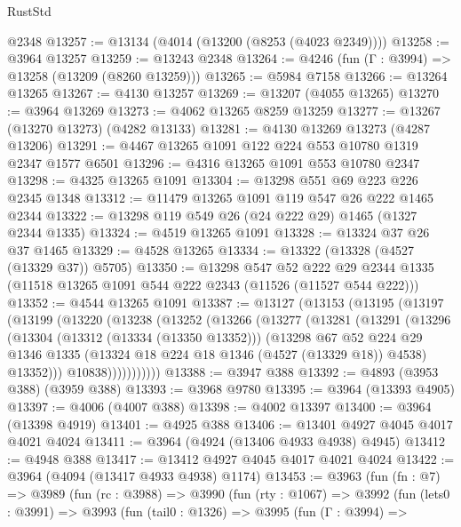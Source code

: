 \begin{lexlean}{RustStd}
\begin{coremodule}
    @2348
@13257 := @13134 (@4014 (@13200 (@8253 (@4023 @2349))))
@13258 := @3964 @13257
@13259 := @13243 @2348
@13264 := @4246 (fun (Γ : @3994) => @13258 (@13209 (@8260 @13259)))
@13265 := @5984 @7158
@13266 := @13264 @13265
@13267 := @4130 @13257
@13269 := @13207 (@4055 @13265)
@13270 := @3964 @13269
@13273 := @4062 @13265 @8259 @13259
@13277 := @13267 (@13270 @13273) (@4282 @13133)
@13281 := @4130 @13269 @13273 (@4287 @13206)
@13291 := @4467 @13265 @1091 @122 @224 @553 @10780 @1319 @2347 @1577 @6501
@13296 := @4316 @13265 @1091 @553 @10780 @2347
@13298 := @4325 @13265 @1091
@13304 := @13298 @551 @69 @223 @226 @2345 @1348
@13312 := @11479 @13265 @1091 @119 @547 @26 @222 @1465 @2344
@13322 := @13298 @119 @549 @26 (@24 @222 @29) @1465 (@1327 @2344 @1335)
@13324 := @4519 @13265 @1091
@13328 := @13324 @37 @26 @37 @1465
@13329 := @4528 @13265
@13334 := @13322 (@13328 (@4527 (@13329 @37)) @5705)
@13350 := @13298
    @547
    @52
    @222
    @29
    @2344
    @1335
    (@11518 @13265 @1091 @544 @222 @2343 (@11526 (@11527 @544 @222)))
@13352 := @4544 @13265 @1091
@13387 := @13127
    (@13153
      (@13195
        (@13197
          (@13199
            (@13220
              (@13238
                (@13252
                  (@13266
                    (@13277
                      (@13281
                        (@13291
                          (@13296
                            (@13304
                              (@13312 (@13334 (@13350 @13352)))
                              (@13298
                                @67
                                @52
                                @224
                                @29
                                @1346
                                @1335
                                (@13324 @18 @224 @18 @1346 (@4527 (@13329 @18)) @4538)
                                @13352)))
                          @10838)))))))))))
@13388 := @3947 @388
@13392 := @4893 (@3953 @388) (@3959 @388)
@13393 := @3968 @9780
@13395 := @3964 (@13393 @4905)
@13397 := @4006 (@4007 @388)
@13398 := @4002 @13397
@13400 := @3964 (@13398 @4919)
@13401 := @4925 @388
@13406 := @13401 @4927 @4045 @4017 @4021 @4024
@13411 := @3964 (@4924 (@13406 @4933 @4938) @4945)
@13412 := @4948 @388
@13417 := @13412 @4927 @4045 @4017 @4021 @4024
@13422 := @3964 (@4094 (@13417 @4933 @4938) @1174)
@13453 := @3963
    (fun (fn : @7) =>
    @3989
      (fun (rc : @3988) =>
      @3990
        (fun (rty : @1067) =>
        @3992
          (fun (lets0 : @3991) =>
          @3993
            (fun (tail0 : @1326) =>
            @3995
              (fun (Γ : @3994) =>

\end{coremodule}
\end{lexlean}

